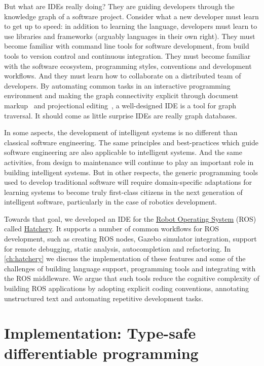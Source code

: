\documentclass[12pt,initial,twoside,maitrise]{dms}
\numberwithin{equation}{section}
\numberwithin{table}{chapter}
\numberwithin{figure}{chapter}
\begin{document}
But what are IDEs really doing? They are guiding developers through the knowledge graph of a software project. Consider what a new developer must learn to get up to speed: in addition to learning the language, developers must learn to use libraries and frameworks (arguably languages in their own right). They must become familiar with command line tools for software development, from build tools to version control and continuous integration. They must become familiar with the software ecosystem, programming styles, conventions and development workflows. And they must learn how to collaborate on a distributed team of developers. By automating common tasks in an interactive programming environment and making the graph connectivity explicit through document markup~\citep{goldfarb1981generalized} and projectional editing~\citep{voelter2014towards}, a well-designed IDE is a tool for graph traversal. It should come as little surprise IDEs are really graph databases.

In some aspects, the development of intelligent systems is no different than classical software engineering. The same principles and best-practices which guide software engineering are also applicable to intelligent systems. And the same activities, from design to maintenance will continue to play an important role in building intelligent systems. But in other respects, the generic programming tools used to develop traditional software will require domain-specific adaptations for learning systems to become truly first-class citizens in the next generation of intelligent software, particularly in the case of robotics development.

Towards that goal, we developed an IDE for the \href{https://www.ros.org/}{Robot Operating System} (ROS) called \href{https://github.com/duckietown/hatchery}{Hatchery}. It supports a number of common workflows for ROS development, such as creating ROS nodes, Gazebo simulator integration, support for remote debugging, static analysis, autocompletion and refactoring. In \autoref{ch:hatchery} we discuss the implementation of these features and some of the challenges of building language support, programming tools and integrating with the ROS middleware. We argue that such tools reduce the cognitive complexity of building ROS applications by adopting explicit coding conventions, annotating unstructured text and automating repetitive development tasks.

\section{Implementation: Type-safe differentiable programming}
\end{document}
